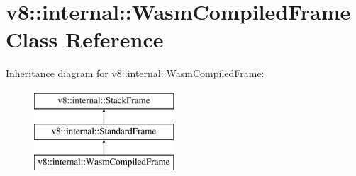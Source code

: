 \hypertarget{classv8_1_1internal_1_1WasmCompiledFrame}{}\section{v8\+:\+:internal\+:\+:Wasm\+Compiled\+Frame Class Reference}
\label{classv8_1_1internal_1_1WasmCompiledFrame}
Inheritance diagram for v8\+:\+:internal\+:\+:Wasm\+Compiled\+Frame\+:\begin{figure}[H]
\begin{center}
\leavevmode
\includegraphics[height=3.000000cm]{classv8_1_1internal_1_1WasmCompiledFrame}
\end{center}
\end{figure}
